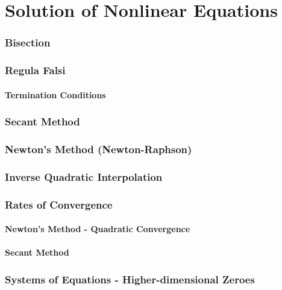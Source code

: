     \chapter{Solution of Nonlinear Equations}
    
    \subsection{Bisection}

    
    \subsection{Regula Falsi}
    
    \subsubsection{Termination Conditions}
    
    \subsection{Secant Method}
    
    \subsection{Newton's Method (Newton-Raphson)}
    
    \subsection{Inverse Quadratic Interpolation}
    
    \subsection{Rates of Convergence}
    
    \subsubsection{Newton's Method - Quadratic Convergence}
    
    \subsubsection{Secant Method}
    
    \subsection{Systems of Equations - Higher-dimensional Zeroes}